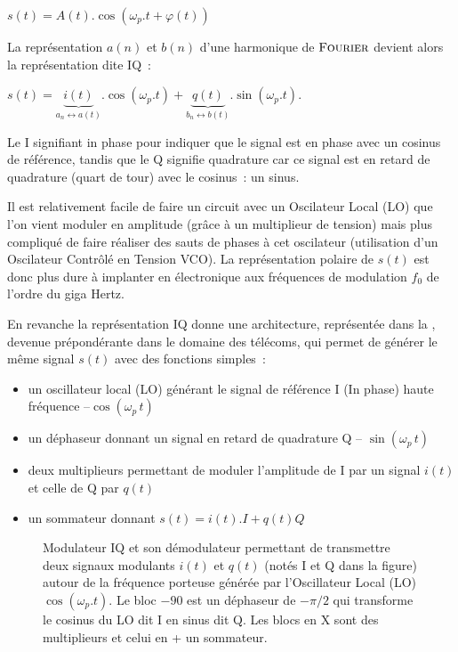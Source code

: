 $s(t) = A(t).\cos(\omega_p.t+\varphi(t))$

La représentation $a(n)$ et $b(n)$ d'une harmonique de $\textsc{Fourier}{}$
devient alors la représentation dite IQ~:

$s(t) = \underbrace{i(t)}_{a_n\leftrightarrow a(t)}.\cos(\omega_p.t) +
\underbrace{q(t)}_{b_n\leftrightarrow b(t)}.\sin(\omega_p.t)$.

Le I signifiant \og{} in phase \fg{} pour indiquer que le signal est
en phase avec un cosinus de référence, tandis que le Q signifie \og{}
quadrature \fg{} car ce signal est en retard de quadrature (quart de
tour) avec le cosinus~: un sinus.


Il est relativement facile de faire un circuit avec un Oscilateur
Local (LO) que l'on vient moduler en amplitude (grâce à un multiplieur
de tension) mais plus compliqué de faire réaliser des sauts de phases
à cet oscilateur (utilisation d'un Oscilateur Contrôlé en Tension
VCO). La représentation polaire de $s(t)$ est donc plus dure à
implanter en électronique aux fréquences de modulation $f_0$ de
l'ordre du giga Hertz.

En revanche la représentation IQ donne une architecture, représentée
dans la , devenue prépondérante dans le
domaine des télécoms, qui permet de générer le même signal $s(t)$ avec
des fonctions simples~:


\begin{itemize}
\item un oscillateur local (LO) générant le signal de référence I (In phase) haute fréquence --$\cos(\omega_p\,t)$
\item un déphaseur donnant un signal en retard de quadrature Q -- $\sin(\omega_p\,t)$
\item deux  multiplieurs  permettant de moduler l'amplitude de I par un signal $i(t)$ et celle de Q par $q(t)$
\item un sommateur donnant $s(t) = i(t) . I + q(t) Q$
\end{itemize}


\begin{figure}[htbp]
  \centering
  \caption{Modulateur IQ et son démodulateur permettant de transmettre
    deux signaux modulants $i(t)$ et $q(t)$ (notés I et Q dans la
    figure) autour de la fréquence porteuse générée par l'Oscillateur
    Local (LO) $\cos(\omega_p.t)$. Le bloc $-90$ est un déphaseur de
    $-\pi/2$ qui transforme le cosinus du LO dit I en sinus dit Q. Les
    blocs en X sont des multiplieurs et celui en + un sommateur.}
  \label{fig:mod_demod_iq}
\end{figure}


